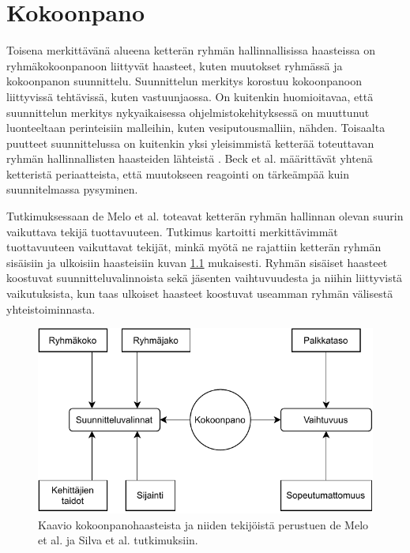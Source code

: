 \chapter{Kokoonpano}

Toisena merkittävänä alueena ketterän ryhmän hallinnallisissa haasteissa on ryhmäkokoonpanoon liittyvät haasteet, kuten muutokset ryhmässä ja kokoonpanon suunnittelu. Suunnittelun merkitys korostuu kokoonpanoon liittyvissä tehtävissä, kuten vastuunjaossa. On kuitenkin huomioitavaa, että suunnittelun merkitys nykyaikaisessa ohjelmistokehityksessä on muuttunut luonteeltaan perinteisiin malleihin, kuten vesiputousmalliin, nähden. Toisaalta puutteet suunnittelussa on kuitenkin yksi yleisimmistä ketterää toteuttavan ryhmän hallinnallisten haasteiden lähteistä \cite{7872736}. Beck et al. \cite{beck2001agile} määrittävät yhtenä ketteristä periaatteista, että muutokseen reagointi on tärkeämpää kuin suunnitelmassa pysyminen.

Tutkimuksessaan de Melo et al. \cite{DEOMELO2013412} toteavat ketterän ryhmän hallinnan olevan suurin vaikuttava tekijä tuottavuuteen. Tutkimus kartoitti merkittävimmät tuottavuuteen vaikuttavat tekijät, minkä myötä ne rajattiin ketterän ryhmän sisäisiin ja ulkoisiin haasteisiin kuvan \ref{fig:kokoonpanohaasteet} mukaisesti. Ryhmän sisäiset haasteet koostuvat suunnitteluvalinnoista sekä jäsenten vaihtuvuudesta ja niihin liittyvistä vaikutuksista, kun taas ulkoiset haasteet koostuvat useamman ryhmän välisestä yhteistoiminnasta.


\begin{figure}[t]
\centering 
\includegraphics[width=1.0\textwidth]{template/figures/kokoonpanohaasteet.pdf}
\caption{Kaavio kokoonpanohaasteista ja niiden tekijöistä perustuen de Melo et al. \cite{DEOMELO2013412} ja Silva et al. \cite{SELLERISILVA201520} tutkimuksiin.\label{fig:kokoonpanohaasteet}}
\end{figure}



